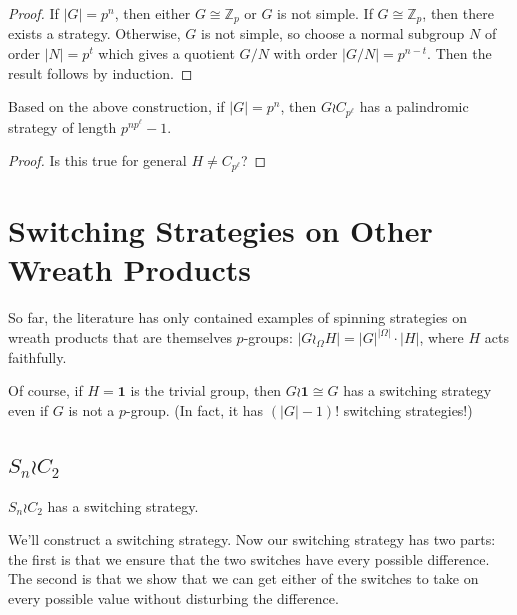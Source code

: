 \begin{proof}
  If $|G| = p^n$, then either $G \cong \mathbb{Z}_p$ or $G$ is not simple.
  If $G \cong \mathbb{Z}_p$, then there exists a strategy. Otherwise,
  $G$ is not simple, so choose a normal subgroup $N$ of order $|N| = p^t$
  which gives a quotient $G/N$ with order $|G/N| = p^{n-t}$. Then the
  result follows by induction.
\end{proof}
\begin{corollary}
  Based on the above construction, if $|G| = p^n$, then $G \wr C_{p^\ell}$
  has a palindromic strategy of length $p^{n p^\ell}-1$.
\end{corollary}
\begin{proof}
  Is this true for general $H \neq C_{p^\ell}$?
\end{proof}

%
%
\section{Switching Strategies on Other Wreath Products}
\label{sec:OtherSwitchingStrategies}

So far, the literature has only contained examples of spinning strategies on
wreath products that are themselves $p$-groups:
$|G \wr_\Omega H| = |G|^{|\Omega|} \cdot |H|$, where $H$ acts faithfully.

Of course, if $H = \textbf{1}$ is the trivial group, then
$G \wr \mathbf{1} \cong G$ has a switching strategy even if $G$ is not a $p$-group.
(In fact, it has $(|G|-1)!$ switching strategies!)

\subsection{\texorpdfstring{$S_n \wr C_2$}{Two copies of the symmetric group on three letters}}
\begin{theorem}
  $S_n \wr C_2$ has a switching strategy.
\end{theorem}

We'll construct a switching strategy.
Now our switching strategy has two parts: the first is that we ensure that
the two switches have every possible difference. The second is that we show
that we can get either of the switches to take on every possible value without
disturbing the difference.

